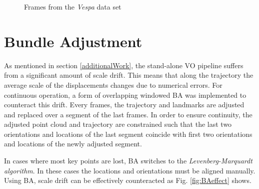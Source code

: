 \begin{figure}[htp]
\hfill
{}\hfill
{}
\caption{Frames from the \emph{Vespa} data set}
\end{figure}

\section{Bundle Adjustment}
\label{bundle adjustment}
As mentioned in section \ref{additionalWork}, the stand-alone VO pipeline suffers from a significant amount of scale drift. 
This means that along the trajectory the average scale of the displacements changes due to numerical errors. 
For continuous operation, a form of overlapping windowed BA was implemented to counteract this drift.  
Every \baEveryNthFrame frames, the trajectory and landmarks are adjusted and replaced over a segment of the last \baReplaceframes frames. 
In order to ensure continuity, the adjusted point cloud and trajectory are constrained such that the last two orientations and locations of the last segment coincide with first two orientations and locations of the newly adjusted segment. \par
In cases where most key points are lost, BA switches to the \emph{Levenberg-Marquardt algorithm}. In these cases the locations and orientations must be aligned manually.  
Using BA, scale drift can be effectively counteracted as Fig. \ref{fig:BAeffect} shows.

